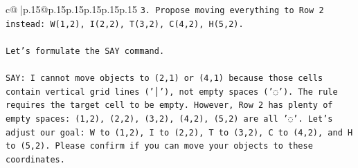 \documentclass{article}
\begin{document}
{\begin{supertabular}{c@{$\;$}|p{.15\linewidth}@{}p{.15\linewidth}p{.15\linewidth}p{.15\linewidth}p{.15\linewidth}p{.15\linewidth}}
{{{\texttt{3. Propose moving everything to Row 2 instead: W(1,2), I(2,2), T(3,2), C(4,2), H(5,2).} \\
\\ 
\texttt{Let's formulate the SAY command.} \\
\\ 
\texttt{SAY: I cannot move objects to (2,1) or (4,1) because those cells contain vertical grid lines ('│'), not empty spaces ('◌'). The rule requires the target cell to be empty. However, Row 2 has plenty of empty spaces: (1,2), (2,2), (3,2), (4,2), (5,2) are all '◌'. Let's adjust our goal: W to (1,2), I to (2,2), T to (3,2), C to (4,2), and H to (5,2). Please confirm if you can move your objects to these coordinates.} \\
            }
        }
    }
     \\ \\


\end{supertabular}}
\end{document}
